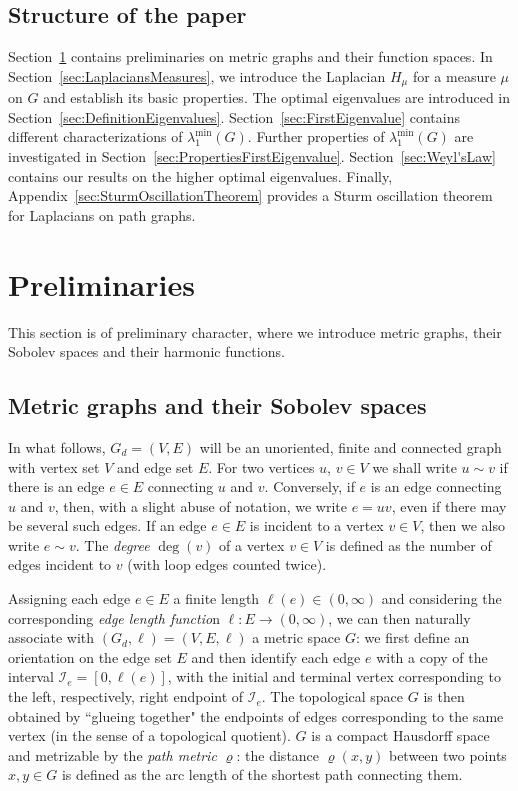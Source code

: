 \documentclass[reqno]{amsart}
\theoremstyle{plain}
\theoremstyle{definition}
\theoremstyle{remark}
\newcommand\cI{{\mathcal{I}}}
\numberwithin{equation}{section}
\begin{document}
\subsection*{Structure of the paper}
Section~\ref{sec:Preliminaries} contains preliminaries on metric graphs and their function spaces. In Section~\ref{sec:LaplaciansMeasures}, we introduce the Laplacian $H_\mu$ for a measure $\mu$ on $G$ and establish its basic properties. The optimal eigenvalues are introduced in Section~\ref{sec:DefinitionEigenvalues}. Section~\ref{sec:FirstEigenvalue} contains different characterizations of $\lambda_1^{\min}(G)$. Further properties of $\lambda_1^{\min}(G)$ are investigated in Section~\ref{sec:PropertiesFirstEigenvalue}. Section~\ref{sec:Weyl'sLaw} contains our results on the higher optimal eigenvalues. Finally, Appendix~\ref{sec:SturmOscillationTheorem} provides a Sturm oscillation theorem for Laplacians on path graphs.

	
\section{Preliminaries} \label{sec:Preliminaries}
This section is of preliminary character, where we introduce metric graphs, their Sobolev spaces and their harmonic functions.
	
\subsection{Metric graphs and their Sobolev spaces} \label{ss:MetricGraphsBasics}

In what follows, $G_d = (V, E)$ will be an unoriented, finite and connected graph with vertex set $V$ and edge set $E$. For two vertices $u$, $v\in V$ we shall write $u\sim v$ if there is an edge $e \in E$ connecting $u$ and $v$. Conversely, if $e$ is an edge connecting $u$ and $v$, then, with a slight abuse of notation, we write $e=uv$, even if there may be several such edges. If an edge $e \in E$ is incident to a vertex $v \in V$, then we also write $e \sim v$. The \emph{degree} $\deg(v)$ of a vertex $v \in V$ is defined as the number of edges incident to $v$ (with loop edges counted twice).


Assigning each edge $e\in E$ a finite length $\ell(e) \in (0,\infty)$ and considering the corresponding {\em edge length functio}n $\ell \colon E\to(0, \infty)$, we can then naturally associate with $(G_d,\ell) = (V, E, \ell)$ a metric space $G$: we first define an orientation on the edge set $E$ and then identify each edge $e$ with a copy of the interval $\cI_e = [0, \ell(e)]$, with the initial and terminal vertex corresponding to the left, respectively, right endpoint of $\cI_e$. The topological space $G$ is then obtained by ``glueing together" the endpoints of edges corresponding to the same vertex (in the sense of a topological quotient). $G$ is a compact Hausdorff space and metrizable by the {\em path metric}\label{not:natpathmet} $\varrho$: the distance $\varrho(x,y)$ between two points $x,y \in G$ is defined as the arc length of the shortest path connecting them.
	
\end{document}
